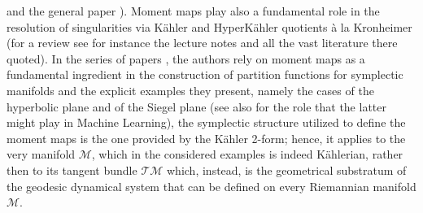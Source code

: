 \documentclass[10pt,a4paper]{article}
\begin{document}
and the general paper \cite{pupallo2}). Moment maps play also a fundamental role in the resolution of singularities via
K\"ahler and HyperK\"ahler quotients {\`a} la Kronheimer (for a review see for instance the lecture notes \cite{freletturepotsdam} and all the vast literature there quoted). In the series of papers \cite{caldobarbaresco,barbaresco2,barbaresco3,marlegibbs,marlentropia}, the authors rely on  moment maps as a fundamental ingredient in the construction of partition functions for symplectic manifolds and the explicit examples they present, namely the cases
of the hyperbolic plane and of the Siegel plane (see also \cite{pgtstheory} for the role that the latter might play in Machine Learning), the symplectic structure utilized to define the moment maps is the one provided by the K\"ahler 2-form; hence, it applies to the very manifold $\mathcal{M}$, which in the considered examples is indeed K\"ahlerian,  rather then to its tangent bundle $\mathcal{TM}$ which,  instead, is the geometrical substratum of the  geodesic dynamical system that can be defined on every Riemannian
manifold $\mathcal{M}$.
\end{document}
